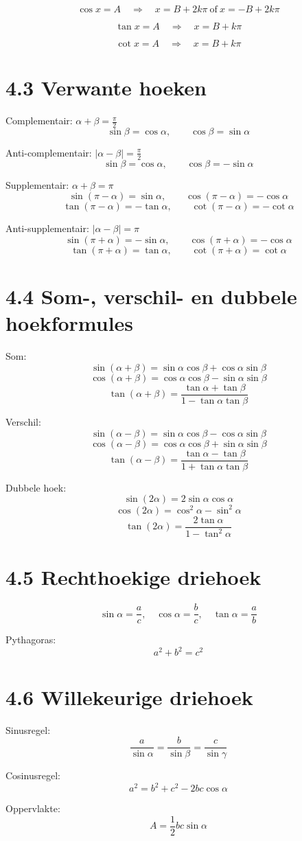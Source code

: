 \documentclass[a4paper,12pt]{article}
\begin{document}
\[
\cos x=A \quad\Rightarrow\quad
x = B + 2k\pi \ \text{of}\ x=-B + 2k\pi
\]

\[
\tan x=A \quad\Rightarrow\quad
x = B + k\pi
\]

\[
\cot x=A \quad\Rightarrow\quad
x = B + k\pi
\]

\section*{4.3 Verwante hoeken}

Complementair: $\alpha+\beta=\frac{\pi}{2}$
\[
\sin\beta = \cos\alpha,\qquad
\cos\beta = \sin\alpha
\]

Anti-complementair: $|\alpha-\beta|=\frac{\pi}{2}$
\[
\sin\beta = \cos\alpha,\qquad
\cos\beta = -\sin\alpha
\]

Supplementair: $\alpha+\beta=\pi$
\[
\sin(\pi-\alpha)=\sin\alpha,\qquad
\cos(\pi-\alpha)=-\cos\alpha
\]
\[
\tan(\pi-\alpha)=-\tan\alpha,\qquad
\cot(\pi-\alpha)=-\cot\alpha
\]

Anti-supplementair: $|\alpha-\beta|=\pi$
\[
\sin(\pi+\alpha)=-\sin\alpha,\qquad
\cos(\pi+\alpha)=-\cos\alpha
\]
\[
\tan(\pi+\alpha)=\tan\alpha,\qquad
\cot(\pi+\alpha)=\cot\alpha
\]

\section*{4.4 Som-, verschil- en dubbele hoekformules}

Som:
\[
\sin(\alpha+\beta)=\sin\alpha\cos\beta+\cos\alpha\sin\beta
\]
\[
\cos(\alpha+\beta)=\cos\alpha\cos\beta-\sin\alpha\sin\beta
\]
\[
\tan(\alpha+\beta)=\frac{\tan\alpha+\tan\beta}{1-\tan\alpha\tan\beta}
\]

Verschil:
\[
\sin(\alpha-\beta)=\sin\alpha\cos\beta-\cos\alpha\sin\beta
\]
\[
\cos(\alpha-\beta)=\cos\alpha\cos\beta+\sin\alpha\sin\beta
\]
\[
\tan(\alpha-\beta)=\frac{\tan\alpha-\tan\beta}{1+\tan\alpha\tan\beta}
\]

Dubbele hoek:
\[
\sin(2\alpha)=2\sin\alpha\cos\alpha
\]
\[
\cos(2\alpha)=\cos^2\alpha-\sin^2\alpha
\]
\[
\tan(2\alpha)=\frac{2\tan\alpha}{1-\tan^2\alpha}
\]

\section*{4.5 Rechthoekige driehoek}

\[
\sin\alpha=\frac{a}{c},\quad
\cos\alpha=\frac{b}{c},\quad
\tan\alpha=\frac{a}{b}
\]

Pythagoras:
\[
a^2+b^2=c^2
\]

\section*{4.6 Willekeurige driehoek}

Sinusregel:
\[
\frac{a}{\sin\alpha}=\frac{b}{\sin\beta}=\frac{c}{\sin\gamma}
\]

Cosinusregel:
\[
a^2=b^2+c^2-2bc\cos\alpha
\]

Oppervlakte:
\[
A=\frac{1}{2}bc\sin\alpha
\]
\end{document}
